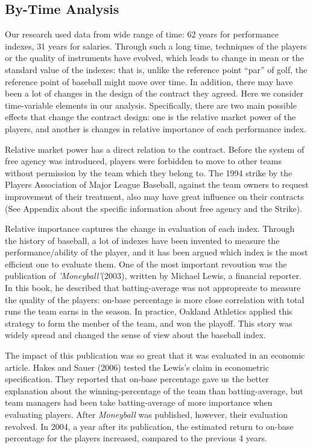 \documentclass[dvipdfmx, 12pt]{article}
\begin{document}
\subsection{By-Time Analysis}

Our research used data from wide range of time: 62 years for performance indexes, 31 years for salaries. Through such a long time, techniques of the players or the quality of instruments have evolved, which leads to change in mean or the standard value of the indexes: that is, unlike the reference point ``par'' of golf, the reference point of baseball might move over time. In addition, there may have been a lot of changes in the design of the contract they agreed. Here we consider time-variable elements in our analysis. Specifically, there are two main possible effects that change the contract design: one is the relative market power of the players, and another is changes in relative importance of each performance index.

Relative market power has a direct relation to the contract. Before the system of free agency was introduced, players were forbidden to move to other teams without permission by the team which they belong to. The 1994 strike by the Players Association of Major League Baseball, against the team owners to request improvement of their treatment, also may have great influence on their contracts (See Appendix about the specific information about free agency and the Strike).

Relative importance captures the change in evaluation of each index. Through the history of baseball, a lot of indexes have been invented to measure the performance/ability of the player, and it has been argued which index is the most efficient one to evaluate them. One of the most important revoution was the publication of \textit{'Moneyball'}(2003), written by Michael Lewis, a financial reporter. In this book, he described that batting-average was not appropreate to measure the quality of the players: on-base percentage is more close correlation with total runs the team earns in the season. In practice, Oakland Athletics applied this strategy to form the menber of the team, and won the playoff. This story was widely spread and changed the sense of view about the baseball index.

The impact of this publication was so great that it was evaluated in an economic article. Hakes and Sauer (2006) tested the Lewis's claim in econometric specification. They reported that on-base percentage gave us the better explanation about the winning-percentage of the team than batting-average, but team managers had been take batting-average of more importance when evaluating players. After \textit{Moneyball} was published, however, their evaluation revolved. In 2004, a year after its publication, the estimated return to on-base percentage for the players increased, compared to the previous 4 years.
\end{document}
